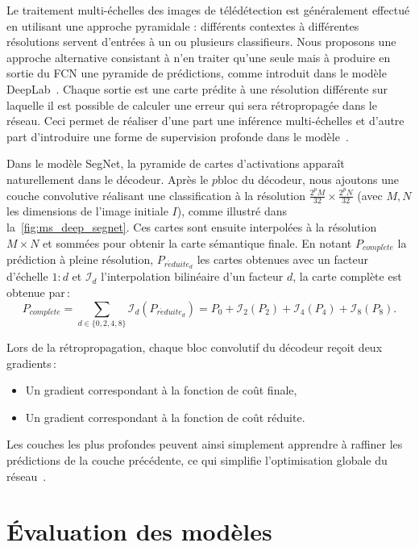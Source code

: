 Le traitement multi-échelles des images de télédétection est généralement effectué en utilisant une approche pyramidale : différents contextes à différentes résolutions servent d'entrées à un ou plusieurs classifieurs. Nous proposons une approche alternative consistant à n'en traiter qu'une seule mais à produire en sortie du \gls{FCN} une pyramide de prédictions, comme introduit dans le modèle DeepLab~\cite{chen_deeplab_2018}. Chaque sortie est une carte prédite à une résolution différente sur laquelle il est possible de calculer une erreur qui sera rétropropagée dans le réseau. Ceci permet de réaliser d'une part une inférence multi-échelles et d'autre part d'introduire une forme de supervision profonde dans le modèle~\cite{lee_deeply-supervised_2015}.

Dans le modèle SegNet, la pyramide de cartes d'activations apparaît naturellement dans le décodeur. Après le $p$\ieme bloc du décodeur, nous ajoutons une couche convolutive réalisant une classification à la résolution $\frac{2^p M}{32} \times \frac{2^p N}{32}$ (avec $M, N$ les dimensions de l'image initiale $I$), comme illustré dans la~\cref{fig:ms_deep_segnet}. Ces cartes sont ensuite interpolées à la résolution $M\times N$ et sommées pour obtenir la carte sémantique finale. En notant $P_{\mathit{compl\grave{e}te}}$ la prédiction à pleine résolution, $P_{\mathit{r\acute{e}duite}_d}$ les cartes obtenues avec un facteur d'échelle $1:d$ et $\mathcal{I}_d$ l'interpolation bilinéaire d'un facteur $d$, la carte complète est obtenue par\,:
\begin{equation}
P_{\mathit{compl\grave{e}te}} = \sum_{d \in \{0, 2, 4, 8\}} \mathcal{I}_d(P_{\mathit{r\acute{e}duite}_d}) = P_0 + \mathcal{I}_2(P_2) + \mathcal{I}_4(P_4) + \mathcal{I}_8(P_8).
\end{equation}

Lors de la rétropropagation, chaque bloc convolutif du décodeur reçoit deux gradients\,:
\begin{itemize}
	\item Un gradient correspondant à la fonction de coût finale,
  \item Un gradient correspondant à la fonction de coût réduite.
\end{itemize}
Les couches les plus profondes peuvent ainsi simplement apprendre à raffiner les prédictions de la couche précédente, ce qui simplifie l'optimisation globale du réseau~\cite{lin_refinenet_2016}.

\section{Évaluation des modèles}
\label{sec:metriques}

